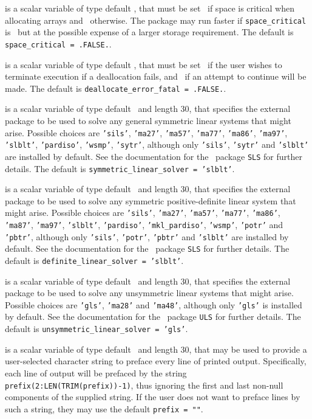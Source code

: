 \documentclass{galahad}
\begin{document}
\begin{description}
 is a scalar variable of type default \logical,
that must be set \true\ if space is critical when allocating arrays
and  \false\ otherwise. The package may run faster if
{\tt space\_critical} is \false\ but at the possible expense of a larger
storage requirement. The default is {\tt space\_critical = .FALSE.}.

 is a scalar variable of type default \logical,
that must be set \true\ if the user wishes to terminate execution if
a deallocation  fails, and \false\ if an attempt to continue
will be made. The default is {\tt deallocate\_error\_fatal = .FALSE.}.

 is a scalar variable of type default \character\
and length 30, that specifies the external package to be used to
solve any general symmetric linear systems that might arise. Possible
choices are
{\tt 'sils'},
{\tt 'ma27'},
{\tt 'ma57'},
{\tt 'ma77'},
{\tt 'ma86'},
{\tt 'ma97'},
{\tt 'slblt'},
{\tt 'pardiso'},
{\tt 'wsmp'},
{\tt 'sytr'},
although only {\tt 'sils'}, {\tt 'sytr'}  and {\tt 'slblt'} are installed by default.
See the documentation for the \galahad\ package {\tt SLS} for further details.
The default is {\tt symmetric\_linear\_solver = 'slblt'}.

 is a scalar variable of type default \character\
and length 30, that specifies the external package to be used to
solve any symmetric positive-definite linear system that might arise. Possible
choices are
{\tt 'sils'},
{\tt 'ma27'},
{\tt 'ma57'},
{\tt 'ma77'},
{\tt 'ma86'},
{\tt 'ma87'},
{\tt 'ma97'},
{\tt 'slblt'},
{\tt 'pardiso'},
{\tt 'mkl\_pardiso'},
{\tt 'wsmp'},
{\tt 'potr'} and
{\tt 'pbtr'},
although only {\tt 'sils'},  {\tt 'potr'}, {\tt 'pbtr'}
and {\tt 'slblt'} are installed by default.
See the documentation for the \galahad\ package {\tt SLS} for further details.
The default is {\tt definite\_linear\_solver = 'slblt'}.

 is a scalar variable of type default
\character\
and length 30, that specifies the external package to be used to
solve any unsymmetric linear systems that might arise. Possible
choices are
{\tt 'gls'},
{\tt 'ma28'}
and
{\tt 'ma48'},
although only {\tt 'gls'} is installed by default.
See the documentation for the \galahad\ package {\tt ULS} for further details.
The default is {\tt unsymmetric\_linear\_solver = 'gls'}.

\itt{prefix} is a scalar variable of type default \character\
and length 30, that may be used to provide a user-selected
character string to preface every line of printed output.
Specifically, each line of output will be prefaced by the string
{\tt prefix(2:LEN(TRIM(prefix))-1)},
thus ignoring the first and last non-null components of the
supplied string. If the user does not want to preface lines by such
a string, they may use the default {\tt prefix = ""}.


\end{description}
\end{document}
